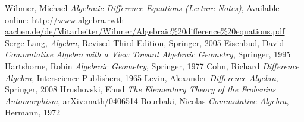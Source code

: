 \begin{thebibliography}{9}
 Wibmer, Michael \emph{Algebraic Difference Equations (Lecture Notes)}, Available online: \url{http://www.algebra.rwth-aachen.de/de/Mitarbeiter/Wibmer/Algebraic\%20difference\%20equations.pdf}
 Serge Lang, \emph{Algebra}, Revised Third Edition, Springer, 2005
 Eisenbud, David \emph{Commutative Algebra with a View Toward Algebraic Geometry}, Springer, 1995
 Hartshorne, Robin \emph{Algebraic Geometry}, Springer, 1977
 Cohn,  Richard \emph{Difference Algebra}, Interscience Publishers, 1965
 Levin, Alexander \emph{Difference Algebra}, Springer, 2008
 Hrushovski, Ehud \emph{The Elementary Theory of the Frobenius Automorphism}, arXiv:math/0406514 
 Bourbaki, Nicolas \emph{Commutative Algebra}, Hermann, 1972
\end{thebibliography}
